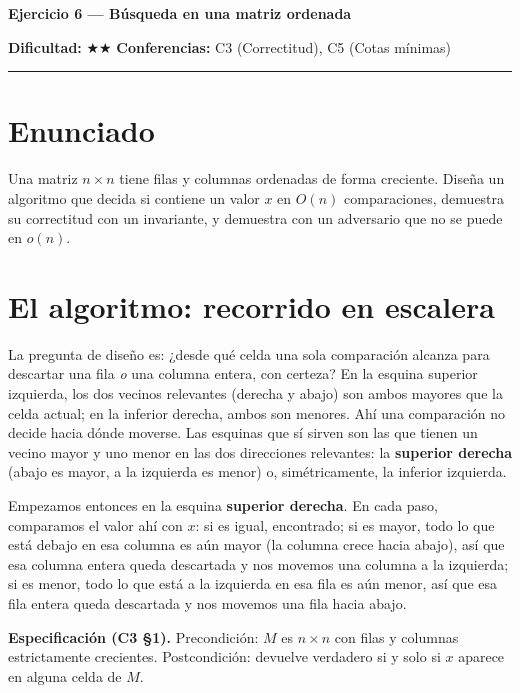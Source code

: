 \documentclass[11pt]{article}
\begin{document}
{\LARGE\bfseries\color{azultitulo} Ejercicio 6 --- Búsqueda en una matriz ordenada}

\vspace{2pt}
\textbf{Dificultad:} $\bigstar\bigstar$ \quad \textbf{Conferencias:} C3 (Correctitud), C5 (Cotas mínimas)
\vspace{8pt}
\hrule
\vspace{12pt}

\section*{Enunciado}
\begin{enunciado}
Una matriz $n\times n$ tiene filas y columnas ordenadas de forma creciente. Diseña un algoritmo que decida
si contiene un valor $x$ en $O(n)$ comparaciones, demuestra su correctitud con un invariante, y demuestra
con un adversario que no se puede en $o(n)$.
\end{enunciado}

\section{El algoritmo: recorrido en escalera}

La pregunta de diseño es: ¿desde qué celda una sola comparación alcanza para descartar una fila \emph{o}
una columna entera, con certeza? En la esquina superior izquierda, los dos vecinos relevantes (derecha y
abajo) son ambos mayores que la celda actual; en la inferior derecha, ambos son menores. Ahí una
comparación no decide hacia dónde moverse. Las esquinas que sí sirven son las que tienen un vecino mayor y
uno menor en las dos direcciones relevantes: la \textbf{superior derecha} (abajo es mayor, a la izquierda es
menor) o, simétricamente, la inferior izquierda.

Empezamos entonces en la esquina \textbf{superior derecha}. En cada paso, comparamos el valor ahí con $x$:
si es igual, encontrado; si es mayor, todo lo que está debajo en esa columna es aún mayor (la columna crece
hacia abajo), así que esa columna entera queda descartada y nos movemos una columna a la izquierda; si es
menor, todo lo que está a la izquierda en esa fila es aún menor, así que esa fila entera queda descartada y
nos movemos una fila hacia abajo.

\textbf{Especificación (C3 §1).} Precondición: $M$ es $n\times n$ con filas y columnas estrictamente
crecientes. Postcondición: devuelve verdadero si y solo si $x$ aparece en alguna celda de $M$.
\end{document}
